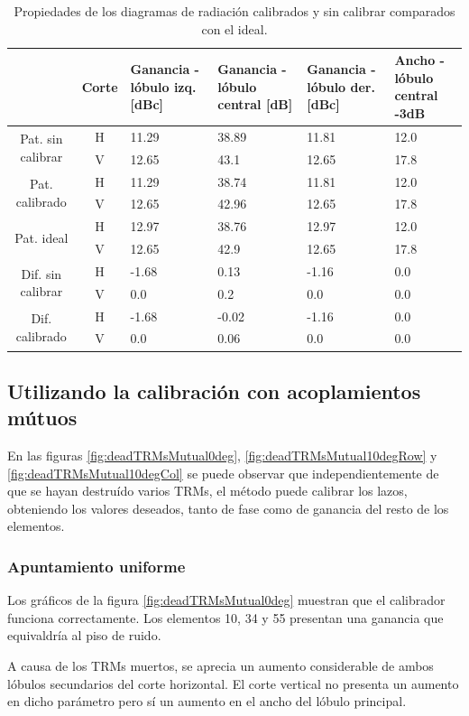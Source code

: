 \begin{table}[H]
  \footnotesize
  \centering
  \begin{tabular}{|c|c|p{2cm}|p{2.5cm}|p{2.5cm}|p{2.5cm}|}
    \cline{2-6}
    \multicolumn{1}{c|}{} & Corte & Ganancia - lóbulo izq. [dBc] & Ganancia - lóbulo central [dB] &
    Ganancia - lóbulo der. [dBc] & Ancho - lóbulo central -3dB \tabularnewline\hline
    \multirow{2}{2cm}{Pat. sin calibrar} & H & 11.29 & 38.89 & 11.81 & 12.0 \tabularnewline\cline{2-6}
     & V & 12.65 & 43.1 & 12.65 & 17.8 \tabularnewline\hline
    \multirow{2}{2cm}{Pat. calibrado} & H & 11.29 & 38.74 & 11.81 & 12.0 \tabularnewline\cline{2-6}
     & V & 12.65 & 42.96 & 12.65 & 17.8 \tabularnewline\hline
    \multirow{2}{2cm}{Pat. ideal} & H & 12.97 & 38.76 & 12.97 & 12.0 \tabularnewline\cline{2-6}
     & V & 12.65 & 42.9 & 12.65 & 17.8 \tabularnewline\hline
    \multirow{2}{2cm}{Dif. sin calibrar} & H & -1.68 & 0.13 & -1.16 & 0.0\tabularnewline\cline{2-6}
     & V & 0.0 & 0.2 & 0.0 & 0.0 \tabularnewline\hline
    \multirow{2}{2cm}{Dif. calibrado} & H & -1.68 & -0.02 & -1.16 & 0.0 \tabularnewline\cline{2-6}
     & V & 0.0 & 0.06 & 0.0 & 0.0 \tabularnewline\hline
  \end{tabular}
  \caption{Propiedades de los diagramas de radiación calibrados y sin calibrar comparados con el ideal.}
  \label{tab:deadTRMsClassical10degRow}
\end{table}


\subsection{Utilizando la calibración con acoplamientos mútuos}

En las figuras \ref{fig:deadTRMsMutual0deg}, \ref{fig:deadTRMsMutual10degRow} y  \ref{fig:deadTRMsMutual10degCol} se puede 
observar que independientemente de que se hayan destruído varios TRMs, el método puede calibrar los lazos, obteniendo los 
valores deseados, tanto de fase como de ganancia del resto de los elementos.

\subsubsection{Apuntamiento uniforme}

Los gráficos de la figura \ref{fig:deadTRMsMutual0deg} muestran que el calibrador funciona correctamente. Los elementos 10, 
34 y 55 presentan una ganancia que equivaldría al piso de ruido.

A causa de los TRMs muertos, se aprecia un aumento considerable de ambos lóbulos secundarios del corte horizontal. El corte 
vertical no presenta un aumento en dicho parámetro pero sí un aumento en el ancho del lóbulo principal.


